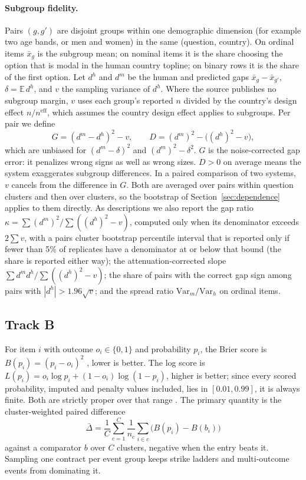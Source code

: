 \documentclass[11pt]{article}
\begin{document}
\paragraph{Subgroup fidelity.} Pairs $(g,g')$ are disjoint groups within one demographic dimension (for example two age bands, or men and women) in the same (question, country). On ordinal items $\bar x_g$ is the subgroup mean; on nominal items it is the share choosing the option that is modal in the human country topline; on binary rows it is the share of the first option. Let $d^h$ and $d^m$ be the human and predicted gaps $\bar x_g - \bar x_{g'}$, $\delta = \mathbb{E}\,d^h$, and $v$ the sampling variance of $d^h$. Where the source publishes no subgroup margin, $v$ uses each group's reported $n$ divided by the country's design effect $n/n^{\mathrm{eff}}$, which assumes the country design effect applies to subgroups. Per pair we define
\begin{equation}
G = (d^m - d^h)^2 - v, \qquad D = (d^m)^2 - \bigl((d^h)^2 - v\bigr),
\end{equation}
which are unbiased for $(d^m - \delta)^2$ and $(d^m)^2 - \delta^2$. $G$ is the noise-corrected gap error: it penalizes wrong signs as well as wrong sizes. $D > 0$ on average means the system exaggerates subgroup differences. In a paired comparison of two systems, $v$ cancels from the difference in $G$. Both are averaged over pairs within question clusters and then over clusters, so the bootstrap of Section~\ref{sec:dependence} applies to them directly. As descriptions we also report the gap ratio $\kappa = \sum (d^m)^2 / \sum ((d^h)^2 - v)$, computed only when its denominator exceeds $2\sum v$, with a pairs cluster bootstrap percentile interval that is reported only if fewer than 5\% of replicates have a denominator at or below that bound (the share is reported either way); the attenuation-corrected slope $\sum d^m d^h / \sum ((d^h)^2 - v)$; the share of pairs with the correct gap sign among pairs with $|d^h| > 1.96\sqrt{v}$; and the spread ratio $\mathrm{Var}_m/\mathrm{Var}_h$ on ordinal items.

\subsection{Track B}
For item $i$ with outcome $o_i \in \{0,1\}$ and probability $p_i$, the Brier score is $B(p_i) = (p_i - o_i)^2$ \citep{brier1950verification}, lower is better. The log score is $L(p_i) = o_i \log p_i + (1-o_i)\log(1-p_i)$, higher is better; since every scored probability, imputed and penalty values included, lies in $[0.01, 0.99]$, it is always finite. Both are strictly proper over that range \citep{gneiting2007strictly}. The primary quantity is the cluster-weighted paired difference
\begin{equation}
\bar\Delta = \frac{1}{C}\sum_{c=1}^{C} \frac{1}{n_c}\sum_{i \in c} \bigl(B(p_i) - B(b_i)\bigr)
\end{equation}
against a comparator $b$ over $C$ clusters, negative when the entry beats it. Sampling one contract per event group keeps strike ladders and multi-outcome events from dominating it.
\end{document}
